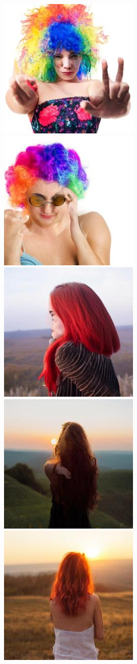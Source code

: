 \begin{figure}[h!]
\begin{subfigure}[t]{0.32\linewidth}
    	\includegraphics[width=0.32\linewidth]{figs/samples_appendix_4/base_cfg_2_ode_prompt_21_image_1.jpg}\;%
    	\includegraphics[width=0.32\linewidth]{figs/samples_appendix_4/base_cfg_2_ode_prompt_21_image_2.jpg}\\ 
    	\includegraphics[width=0.32\linewidth]{figs/samples_appendix_4/base_cfg_2_ode_prompt_33_image_0.jpg}\;%
    	\includegraphics[width=0.32\linewidth]{figs/samples_appendix_4/base_cfg_2_ode_prompt_33_image_1.jpg}\;%
    	\includegraphics[width=0.32\linewidth]{figs/samples_appendix_4/base_cfg_2_ode_prompt_33_image_2.jpg}\\ 

\end{subfigure}
\end{figure}
